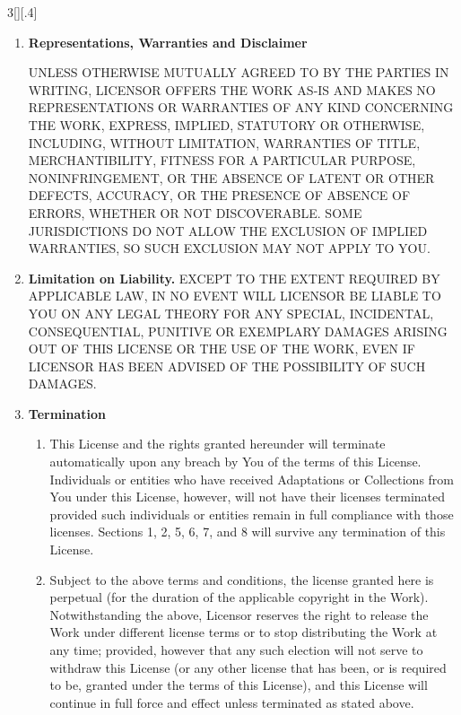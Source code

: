 \documentclass[8pt,a4paper]{article}
\begin{document}
\begin{multicols}{3}[][.4\paperwidth]
\begin{enumerate}
\begin{enumerate}
  \end{enumerate}

 \item \textbf{Representations, Warranties and Disclaimer}

 UNLESS OTHERWISE MUTUALLY AGREED TO BY THE PARTIES IN WRITING, LICENSOR
 OFFERS THE WORK AS-IS AND MAKES NO REPRESENTATIONS OR WARRANTIES OF ANY
 KIND CONCERNING THE WORK, EXPRESS, IMPLIED, STATUTORY OR OTHERWISE,
 INCLUDING, WITHOUT LIMITATION, WARRANTIES OF TITLE, MERCHANTIBILITY,
 FITNESS FOR A PARTICULAR PURPOSE, NONINFRINGEMENT, OR THE ABSENCE OF
 LATENT OR OTHER DEFECTS, ACCURACY, OR THE PRESENCE OF ABSENCE OF ERRORS,
 WHETHER OR NOT DISCOVERABLE. SOME JURISDICTIONS DO NOT ALLOW THE EXCLUSION
 OF IMPLIED WARRANTIES, SO SUCH EXCLUSION MAY NOT APPLY TO YOU.

 \item \textbf{Limitation on Liability.} EXCEPT TO THE EXTENT REQUIRED BY APPLICABLE
       LAW, IN NO EVENT WILL LICENSOR BE LIABLE TO YOU ON ANY LEGAL THEORY FOR
       ANY SPECIAL, INCIDENTAL, CONSEQUENTIAL, PUNITIVE OR EXEMPLARY DAMAGES
       ARISING OUT OF THIS LICENSE OR THE USE OF THE WORK, EVEN IF LICENSOR HAS
       BEEN ADVISED OF THE POSSIBILITY OF SUCH DAMAGES.

 \item \textbf{Termination}

 \begin{enumerate}

  \item This License and the rights granted hereunder will terminate
        automatically upon any breach by You of the terms of this License.
        Individuals or entities who have received Adaptations or Collections
        from You under this License, however, will not have their licenses
        terminated provided such individuals or entities remain in full
        compliance with those licenses. Sections 1, 2, 5, 6, 7, and 8 will
        survive any termination of this License.
  \item Subject to the above terms and conditions, the license granted here is
        perpetual (for the duration of the applicable copyright in the Work).
        Notwithstanding the above, Licensor reserves the right to release the
        Work under different license terms or to stop distributing the Work at
        any time; provided, however that any such election will not serve to
        withdraw this License (or any other license that has been, or is
        required to be, granted under the terms of this License), and this
        License will continue in full force and effect unless terminated as
        stated above.


\end{enumerate}
\end{enumerate}
\end{multicols}
\end{document}
